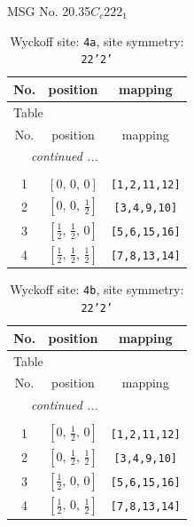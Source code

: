 \documentclass[fleqn,8pt]{jsarticle}
\begin{document}
\setcounter{MaxMatrixCols}{32}

\renewcommand{\tablename}{Table~}
\renewcommand{\figurename}{Figure~}
\begin{center}
\LARGE
MSG No. 20.35\quad$C_{c}222_{1}$
\end{center}
\renewcommand{\arraystretch}{1.2}
\begin{longtable}{ccc}
\caption{Wyckoff site: {\tt 4a}, site symmetry: {\tt 22'2'}}
 \\
 \hline \hline
No. & position & mapping \\ \hline \endfirsthead

\multicolumn{2}{l}{\tablename\ \thetable{}} \\
 \hline \hline
No. & position & mapping \\ \hline \endhead

 \hline \hline
\multicolumn{2}{r}{\footnotesize\it continued ...} \\ \endfoot

 \hline \hline
\multicolumn{2}{r}{} \\ \endlastfoot

1 & $\left[ 0,\, 0,\, 0 \right]$ & {\tt [1,2,11,12]} \\ \hline
2 & $\left[ 0,\, 0,\, \frac{1}{2} \right]$ & {\tt [3,4,9,10]} \\ \hline
3 & $\left[ \frac{1}{2},\, \frac{1}{2},\, 0 \right]$ & {\tt [5,6,15,16]} \\ \hline
4 & $\left[ \frac{1}{2},\, \frac{1}{2},\, \frac{1}{2} \right]$ & {\tt [7,8,13,14]} \\
\end{longtable}
\renewcommand{\arraystretch}{1.2}
\begin{longtable}{ccc}
\caption{Wyckoff site: {\tt 4b}, site symmetry: {\tt 22'2'}}
 \\
 \hline \hline
No. & position & mapping \\ \hline \endfirsthead

\multicolumn{2}{l}{\tablename\ \thetable{}} \\
 \hline \hline
No. & position & mapping \\ \hline \endhead

 \hline \hline
\multicolumn{2}{r}{\footnotesize\it continued ...} \\ \endfoot

 \hline \hline
\multicolumn{2}{r}{} \\ \endlastfoot

1 & $\left[ 0,\, \frac{1}{2},\, 0 \right]$ & {\tt [1,2,11,12]} \\ \hline
2 & $\left[ 0,\, \frac{1}{2},\, \frac{1}{2} \right]$ & {\tt [3,4,9,10]} \\ \hline
3 & $\left[ \frac{1}{2},\, 0,\, 0 \right]$ & {\tt [5,6,15,16]} \\ \hline
4 & $\left[ \frac{1}{2},\, 0,\, \frac{1}{2} \right]$ & {\tt [7,8,13,14]} \\
\end{longtable}
\end{document}
